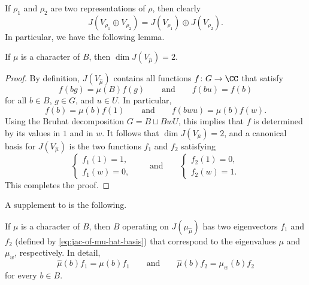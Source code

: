 \documentclass[../main.tex]{subfiles}
\begin{document}
If $\rho_1$ and $\rho_2$ are two representations of $\rho$, then clearly
\[J\left(V_{\rho_1}\oplus V_{\rho_2}\right)=J\left(V_{\rho_1}\right)\oplus J\left(V_{\rho_2}\right).\]
In particular, we have the following lemma.
\begin{lemma} \label{lem:jac-of-mu-hat}
	If $\mu$ is a character of $B$, then $\dim J(V_{\widehat\mu})=2$.
\end{lemma}
\begin{proof}
	By definition, $J(V_{\widehat\mu})$ contains all functions $f\colon G\to\CC$ that satisfy
	\[f(bg)=\mu(B)f(g)\qquad\text{and}\qquad f(bu)=f(b)\]
	for all $b\in B$, $g\in G$, and $u\in U$. In particular,
	\[f(b)=\mu(b)f(1)\qquad\text{and}\qquad f(bwu)=\mu(b)f(w).\]
	Using the Bruhat decomposition $G=B\sqcup BwU$, this implies that $f$ is determined by its values in $1$ and in $w$. It follows that $\dim J(V_{\widehat\mu})=2$, and a canonical basis for $J(V_{\widehat\mu})$ is the two functions $f_1$ and $f_2$ satisfying
	\begin{equation}
		\left\{\begin{array}{c}
			f_1(1)=1, \\
			f_1(w)=0,
		\end{array}\right.\qquad\text{and}\qquad\left\{\begin{array}{c}
			f_2(1)=0, \\
			f_2(w)=1.
		\end{array}\right. \label{eq:jac-of-mu-hat-basis}
	\end{equation}
	This completes the proof.
\end{proof}
A supplement to  is the following.
\begin{lemma} \label{lem:eigens-of-jac-mu-hat}
	If $\mu$ is a character of $B$, then $B$ operating on $J(\mu_{\widehat\mu})$ has two eigenvectors $f_1$ and $f_2$ (defined by \eqref{eq:jac-of-mu-hat-basis}) that correspond to the eigenvalues $\mu$ and $\mu_w$, respectively. In detail,
	\begin{equation}
		\widehat\mu(b)f_1=\mu(b)f_1\qquad\text{and}\qquad\widehat\mu(b)f_2=\mu_w(b)f_2 \label{eq:desired-eigen-of-jac-mu-hat}
	\end{equation}
	for every $b\in B$.
\end{lemma}
\end{document}
